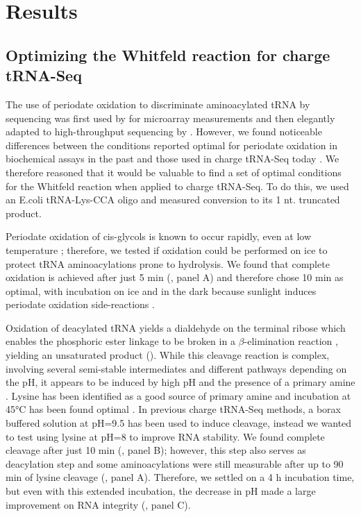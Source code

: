\documentclass[9pt,lineno]{elife}
\begin{document}
\section{Results}
\subsection{Optimizing the Whitfeld reaction for charge tRNA-Seq}
The use of periodate oxidation to discriminate aminoacylated tRNA by sequencing was first used by \cite{Dittmar2005-va} for microarray measurements and then elegantly adapted to high-throughput sequencing by \cite{Evans2017-st}.
However, we found noticeable differences between the conditions reported optimal for periodate oxidation in biochemical assays in the past \citep{Khym1961-xf, Neu1964-hu, Khym1968-ac, Dyer1956-zh} and those used in charge tRNA-Seq today \citep{Evans2017-st, Behrens2021-gb, Watkins2022-er, Pavlova2020-aj, Tsukamoto2022-rc}.
We therefore reasoned that it would be valuable to find a set of optimal conditions for the Whitfeld reaction when applied to charge tRNA-Seq.
To do this, we used an E.coli tRNA-Lys-CCA oligo and measured conversion to its 1 nt. truncated product.

Periodate oxidation of cis-glycols is known to occur rapidly, even at low temperature \citep{Dyer1956-zh}; therefore, we tested if oxidation could be performed on ice to protect tRNA aminoacylations prone to hydrolysis.
We found that complete oxidation is achieved after just 5 min (, panel A) and therefore chose 10 min as optimal, with incubation on ice and in the dark because sunlight induces periodate oxidation side-reactions \citep{Erskine1953-cr}.

Oxidation of deacylated tRNA yields a dialdehyde on the terminal ribose which enables the phosphoric ester linkage to be broken in a $\beta$-elimination reaction \citep{Rammler1971-mt, uziel1973periodate}, yielding an unsaturated product ().
While this cleavage reaction is complex, involving several semi-stable intermediates and different pathways depending on the pH, it appears to be induced by high pH and the presence of a primary amine \citep{Uziel1975-ja}.
Lysine has been identified as a good source of primary amine and incubation at 45°C has been found optimal \citep{Khym1961-xf, Neu1964-hu}.
In previous charge tRNA-Seq methods, a borax buffered solution at pH=9.5 has been used to induce cleavage, instead we wanted to test using lysine at pH=8 to improve RNA stability.
We found complete cleavage after just 10 min (, panel B); however, this step also serves as deacylation step and some aminoacylations were still measurable after up to 90 min of lysine cleavage (, panel A).
Therefore, we settled on a 4 h incubation time, but even with this extended incubation, the decrease in pH made a large improvement on RNA integrity (, panel C).
\end{document}
